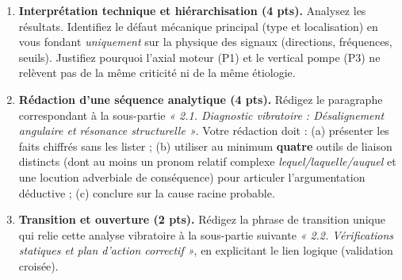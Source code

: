 \documentclass[11pt]{article}
\begin{document}
\begin{exercice}
\begin{enumerate}
    \item \textbf{Interprétation technique et hiérarchisation (4 pts).} Analysez les résultats. Identifiez le défaut mécanique principal (type et localisation) en vous fondant \textit{uniquement} sur la physique des signaux (directions, fréquences, seuils). Justifiez pourquoi l'axial moteur (P1) et le vertical pompe (P3) ne relèvent pas de la même criticité ni de la même étiologie.
    \item \textbf{Rédaction d'une séquence analytique (4 pts).} Rédigez le paragraphe correspondant à la sous-partie \textit{« 2.1. Diagnostic vibratoire : Désalignement angulaire et résonance structurelle »}. Votre rédaction doit : (a) présenter les faits chiffrés sans les lister ; (b) utiliser au minimum \textbf{quatre} outils de liaison distincts (dont au moins un pronom relatif complexe \textit{lequel/laquelle/auquel} et une locution adverbiale de conséquence) pour articuler l'argumentation déductive ; (c) conclure sur la cause racine probable.
    \item \textbf{Transition et ouverture (2 pts).} Rédigez la phrase de transition unique qui relie cette analyse vibratoire à la sous-partie suivante \textit{« 2.2. Vérifications statiques et plan d'action correctif »}, en explicitant le lien logique (validation croisée).
\end{enumerate}
\end{exercice}
\end{document}
